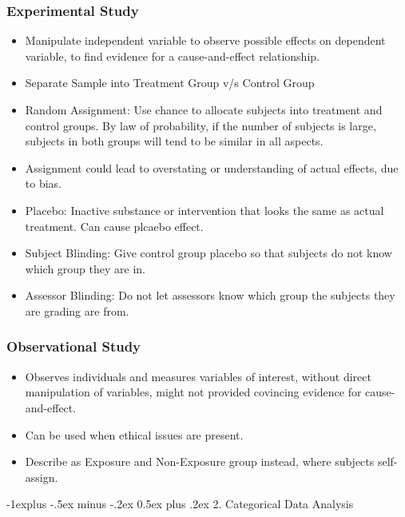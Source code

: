 \documentclass[10pt, landscape]{article}
\makeatletter
\renewcommand{\section}{\@startsection{section}{1}{0mm}%
                                {-1ex plus -.5ex minus -.2ex}%
                                {0.5ex plus .2ex}%
                                {\normalfont\large\bfseries}}
\renewcommand{\section}{\@startsection{section}{2}{0mm}%
                                {-1explus -.5ex minus -.2ex}%
                                {0.5ex plus .2ex}%
                                {\normalfont\normalsize\bfseries}}
\makeatother
\begin{document}
\begin{multicols*}{3}
\subsubsection{Experimental Study}
\begin{itemize}
    \item Manipulate independent variable to observe possible effects on dependent variable, to find evidence for a cause-and-effect relationship.
    \item Separate Sample into Treatment Group v/s Control Group
    \item Random Assignment: Use chance to allocate subjects into treatment and control groups. By law of probability, if the number of subjects is large, subjects in both groups will tend to be similar in all aspects.
    \item Assignment could lead to overstating or understanding of actual effects, due to bias.
    \item Placebo: Inactive substance or intervention that looks the same as actual treatment. Can cause plcaebo effect.
    \item Subject Blinding: Give control group placebo so that subjects do not know which group they are in.
    \item Assessor Blinding: Do not let assessors know which group the subjects they are grading are from.
\end{itemize}
\subsubsection{Observational Study}
\begin{itemize}
    \item Observes individuals and measures variables of interest, without direct manipulation of variables, might not provided covincing evidence for cause-and-effect.
    \item Can be used when ethical issues are present.
    \item Describe as Exposure and Non-Exposure group instead, where subjects self-assign.
\end{itemize}

\section{2. Categorical Data Analysis}

\end{multicols*}
\end{document}
